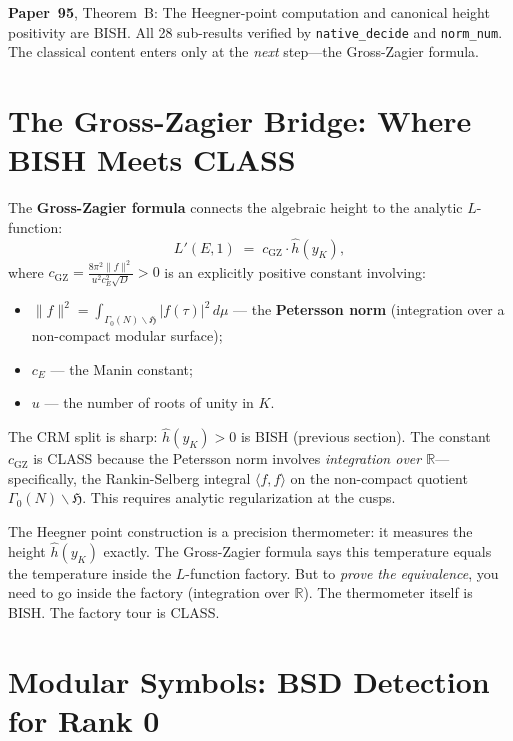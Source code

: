 \documentclass[11pt,twoside,openany]{report}
\theoremstyle{remark}
\newcommand{\BISH}{\textsf{BISH}}
\newcommand{\CLASS}{\textsf{CLASS}}
\newcommand{\paperref}[1]{\textbf{Paper~#1}}
\begin{document}
\begin{keyrefbox}
  \paperref{95}, Theorem~B: The Heegner-point computation and canonical height positivity are \BISH. All 28 sub-results verified by \texttt{native\_decide} and \texttt{norm\_num}. The classical content enters only at the \emph{next} step---the Gross-Zagier formula.
\end{keyrefbox}


\section{The Gross-Zagier Bridge: Where BISH Meets CLASS}

The \textbf{Gross-Zagier formula} connects the algebraic height to the analytic $L$-function:
\[
  L'(E, 1) \;=\; c_{\mathrm{GZ}} \cdot \hat{h}(y_K),
\]
where $c_{\mathrm{GZ}} = \frac{8\pi^2 \|f\|^2}{u^2 c_E^2 \sqrt{D}} > 0$ is an explicitly positive constant involving:
\begin{itemize}
  \item $\|f\|^2 = \int_{\Gamma_0(N) \backslash \mathfrak{H}} |f(\tau)|^2\, d\mu$ --- the \textbf{Petersson norm} (integration over a non-compact modular surface);
  \item $c_E$ --- the Manin constant;
  \item $u$ --- the number of roots of unity in $K$.
\end{itemize}

The CRM split is sharp: $\hat{h}(y_K) > 0$ is \BISH{} (previous section). The constant $c_{\mathrm{GZ}}$ is \CLASS{} because the Petersson norm involves \emph{integration over $\mathbb{R}$}---specifically, the Rankin-Selberg integral $\langle f, f \rangle$ on the non-compact quotient $\Gamma_0(N) \backslash \mathfrak{H}$. This requires analytic regularization at the cusps.

\begin{analogybox}
The Heegner point construction is a precision thermometer: it measures the height $\hat{h}(y_K)$ exactly. The Gross-Zagier formula says this temperature equals the temperature inside the $L$-function factory. But to \emph{prove the equivalence}, you need to go inside the factory (integration over $\mathbb{R}$). The thermometer itself is \BISH. The factory tour is \CLASS.
\end{analogybox}


\section{Modular Symbols: BSD Detection for Rank 0}
\end{document}
